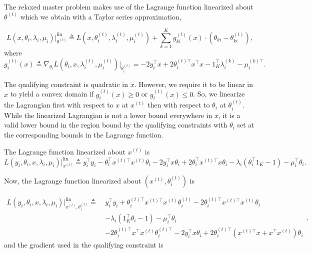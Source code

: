 \documentclass{article} %
\newcommand{\T}{\ensuremath{\top}}
\renewcommand{\leq}{\leqslant}
\renewcommand{\geq}{\geqslant}
\begin{document}
The relaxed master problem makes use of the Lagrange function
linearized about $\theta^{(t)}$ which we obtain with a Taylor
series approximation,

\begin{equation}
    L(x, \theta_i, \lambda_i, \mu_i) \big\vert_{\theta^{(t)}}^{\text{lin}} \triangleq L(x, \theta_i^{(t)}, \lambda_i^{(t)}, \mu_i^{(t)}) + \sum_{k=1}^K g_{ki}^{(t)}(x) \cdot \left(\theta_{ki} - \theta_{ki}^{(t)} \right),
\end{equation}
where 
\begin{equation}\label{eqn:qc1}
g^{(t)}_{i}(x) \triangleq \nabla_{\theta_i} L \left(\theta_i, x, \lambda_i^{(t)}, \mu_i^{(t)} \right) \big\vert_{\theta_i^{(t)}} = -2 y_i^\T x + 2 \theta^{(t)\T}_i x^\T x - 1_K^\T \lambda_i^{(k)} - \mu_i^{(k)\T}.
\end{equation}

The qualifying constraint is quadratic in $x$. However, we require it to be
linear in $x$ to yield a convex domain if $g^{(t)}_{i}(x) \geq 0$ or
$g^{(t)}_{i}(x) \leq 0$. So, we linearize the Lagrangian first with respect to
$x$ at $x^{(t)}$ then with respect to $\theta_i$ at $\theta_i^{(t)}$. While the
linearized Lagrangian is not a lower bound everywhere in $x$, it is a valid
lower bound in the region bound by the qualifying constraints with $\theta_i$
set at the corresponding bounds in the Lagrange function.


The Lagrange function linearized about $x^{(t)}$ is
\begin{equation}
L(y_i, \theta_i, x, \lambda_i, \mu_i) \bigg\vert^{\text{lin}}_{x^{(t)}} \triangleq 
y_i^\T y_i - \theta_i^\T x^{(t)\T} x^{(t)} \theta_i - 2 y_i^\T x \theta_i + 2 \theta_i^\T x^{(t)\T} x \theta_i - \lambda_i(\theta_i^\T 1_K - 1) - \mu_i^\T \theta_i.
\end{equation}

Now, the Lagrange function linearized about $(x^{(t)}, \theta_i^{(t)})$ is

\begin{equation}
\begin{split}
L(y_i, \theta_i, x, \lambda_i, \mu_i) \bigg|^{\text{lin}}_{x^{(t)}, \theta_i^{(t)}} \triangleq\ & y_i^\T y_i + \theta_i^{(t)\T} x^{(t)\T} x^{(t)} \theta_i^{(t)} -2 \theta_i^{(t)\T} x^{(t)\T} x^{(t)} \theta_i \\
& - \lambda_i(1_K^\T \theta_i - 1) - \mu_i^\T \theta_i \\
& - 2 \theta_i^{(t)\T} x^\T x^{(t)} \theta_i^{(t)\T} - 2 y_i^\T x \theta_i + 2 \theta_i^{(t)\T} (x^{(t)\T} x + x^\T x^{(t)}) \theta_i
\end{split},
\end{equation}
and the gradient used in the qualifying constraint is
\end{document}
